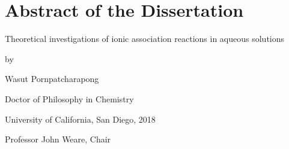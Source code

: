 \newpage

\begingroup
\renewcommand{\cleardoublepage}{}
\clearpage
\vspace*{1.5in}
\chapter*{Abstract of the Dissertation}
\endgroup

\vspace{1.2cm}

\begin{center}
    Theoretical investigations of ionic association reactions in aqueous solutions

    \vspace{0.6cm}

    by

    \vspace{0.6cm}

    \begin{spacing}{1.0}
        Wasut Pornpatcharapong

        Doctor of Philosophy in Chemistry

        University of California, San Diego, 2018
    \end{spacing}

    \vspace{0.6cm}

    Professor John Weare, Chair
\end{center}

\vspace{0.6cm}

\begin{spacing}{2.0}
    \lipsum[1-3]
\end{spacing}
